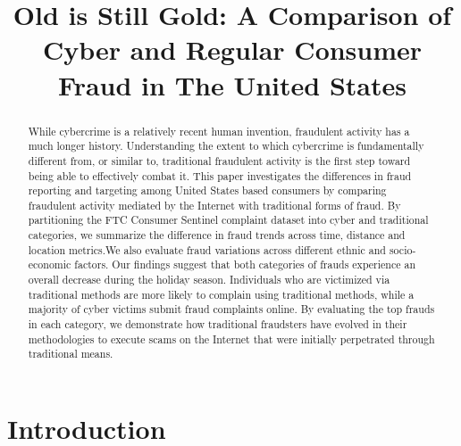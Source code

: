 \documentclass[conference]{IEEEtran}
\begin{document}
\title{Old is Still Gold: A Comparison of Cyber and Regular Consumer Fraud in The United States}


\author{
}

\maketitle

\begin{abstract}

While cybercrime is a relatively recent human invention, fraudulent activity
has a much longer history. Understanding the extent to which cybercrime is fundamentally different from, or similar to, traditional fraudulent activity is the first step toward being able to effectively combat it. This paper investigates the differences in fraud
reporting and targeting among United States based consumers by comparing
fraudulent activity mediated by the Internet with traditional forms of
fraud. By partitioning the FTC Consumer Sentinel complaint dataset into
cyber and traditional categories, we summarize the difference in fraud
trends across time, distance and location metrics.We also evaluate fraud
variations across different ethnic and socio-economic factors. Our findings
suggest that both categories of frauds experience an overall decrease during
the holiday season. Individuals who are victimized via traditional methods
are more likely to complain using traditional methods, while a majority of
cyber victims submit fraud complaints online. By evaluating the top frauds
in each category, we demonstrate how traditional fraudsters have evolved in
their methodologies to execute scams on the Internet that were initially
perpetrated through traditional means.

\end{abstract}

\section{Introduction}
\end{document}
